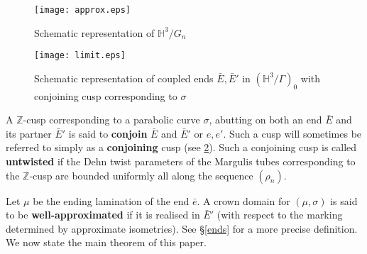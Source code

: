 \documentclass{amsart}
\theoremstyle{definition}
\newcommand{\integers}{\mathbb{Z}}
\newcommand\HHH{{\mathbb H}}
\begin{document}
\begin{figure}
	
	

	\texttt{[image: approx.eps]}
	
	
	
	\caption{Schematic representation of $\HHH^3/G_n$}
	\label{M_n}
	\end{figure}

\begin{figure}

\texttt{[image: limit.eps]}



\caption{Schematic representation of coupled ends $\bar E, \bar E'$ in $(\HHH^3/\Gamma)_0$ with conjoining cusp corresponding to $\sigma$}
\label{Gamma}
\end{figure}
 
 
  A $\integers$-cusp corresponding to a parabolic curve $\sigma$, abutting on both an end $\bar E$ and its partner
   $\bar E'$ is said to {\bf conjoin}  $\bar E$ and 
   $\bar E'$ or $e, e'$. Such a cusp will sometimes be referred to simply as a {\bf conjoining} cusp (see \cref{Gamma}).
  Such a conjoining cusp is called {\bf untwisted} if  the Dehn twist parameters of the Margulis tubes corresponding to the $\integers$-cusp are bounded uniformly all along the sequence $(\rho_n)$.
  
  Let $\mu$ be the ending lamination of the end $\bar e$.
  A  crown domain for $(\mu, \sigma)$  is said to be {\bf well-approximated} if 
    it is realised  in $\bar E'$ (with respect to the marking determined by approximate isometries).  
  See \S\ref{ends} for a more precise definition. We now state the main theorem of this paper.
 
\end{document}
